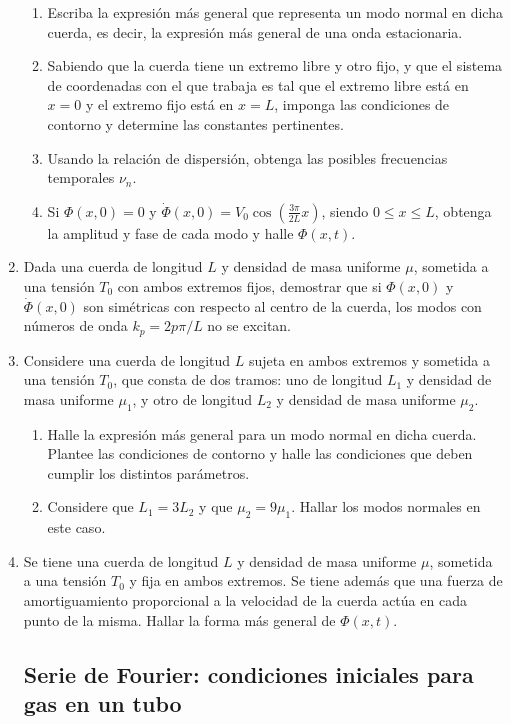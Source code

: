 \documentclass[11pt,spanish,a4paper]{article}
\begin{document}
\begin{enumerate}
\begin{enumerate}
\item Escriba la expresión más general que representa un modo normal en
dicha cuerda, es decir, la expresión más general de una onda estacionaria.
\item Sabiendo que la cuerda tiene un extremo libre y otro fijo, y que el
sistema de coordenadas con el que trabaja es tal que el extremo libre
está en $x=0$ y el extremo fijo está en $x=L$, imponga las condiciones
de contorno y determine las constantes pertinentes.
\item Usando la relación de dispersión, obtenga las posibles frecuencias
temporales $\nu_{n}$. 
\item Si $\Phi(x,0)=0$ y $\dot{\Phi}(x,0)=V_{0}\cos\left(\frac{3\pi}{2L}x\right)$,
siendo $0\le x\le L$, obtenga la amplitud y fase de cada modo y halle
$\Phi(x,t)$.
\end{enumerate}



\item Dada una cuerda de longitud $L$ y densidad de masa uniforme $\mu$,
sometida a una tensión $T_{0}$ con ambos extremos fijos, demostrar
que si $\Phi(x,0)$ y $\dot{\Phi}(x,0)$ son simétricas con respecto
al centro de la cuerda, los modos con números de onda $k_{p}=2p\pi/L$
no se excitan.
\item Considere una cuerda de longitud $L$ sujeta en ambos extremos y sometida
a una tensión $T_{0}$, que consta de dos tramos: uno de longitud
$L_{1}$ y densidad de masa uniforme $\mu_{1}$, y otro de longitud
$L_{2}$ y densidad de masa uniforme $\mu_{2}$.
\begin{enumerate}
\item Halle la expresión más general para un modo normal en dicha cuerda.
Plantee las condiciones de contorno y halle las condiciones que deben
cumplir los distintos parámetros.
\item Considere que $L_{1}=3L_{2}$ y que $\mu_{2}=9\mu_{1}$. Hallar los
modos normales en este caso.
\end{enumerate}


\item Se tiene una cuerda de longitud $L$ y densidad de masa uniforme $\mu$,
sometida a una tensión $T_{0}$ y fija en ambos extremos. Se tiene
además que una fuerza de amortiguamiento proporcional a la velocidad
de la cuerda actúa en cada punto de la misma. Hallar la forma más
general de $\Phi(x,t)$.


\subsection*{Serie de Fourier: condiciones iniciales para gas en un tubo}



\end{enumerate}
\end{document}
